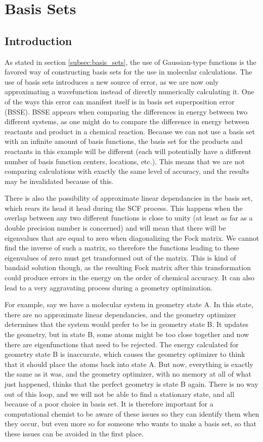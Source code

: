 \chapter{Basis Sets}
\label{chap:basis_sets}
\section{Introduction}
As stated in section \ref{subsec:basis_sets}, the use of Gaussian-type functions is the favored way of constructing basis sets for the use in molecular calculations. The use of basis sets introduces a new source of error, as we are now only approximating a wavefunction instead of directly numerically calculating it. One of the ways this error can manifest itself is in basis set superposition error (BSSE). BSSE appears when comparing the differences in energy between two different systems, as one might do to compare the difference in energy between reactants and product in a chemical reaction. Because we can not use a basis set with an infinite amount of basis functions, the basis set for the products and reactants in this example will be different (each will potentially have a different number of basis function centers, locations, etc.). This means that we are not comparing calculations with exactly the same level of accuracy, and the results may be invalidated because of this. 

There is also the possibility of approximate linear dependancies in the basis set, which rears its head it head during the SCF process. This happens when the overlap between any two different functions is close to unity (at least as far as a double precision number is concerned) and will mean that there will be eigenvalues that are equal to zero when diagonalizing the Fock matrix. We cannot find the inverse of such a matrix, so therefore the functions leading to these eigenvalues of zero must get transformed out of the matrix. This is kind of bandaid solution though, as the resulting Fock matrix after this transformation could produce errors in the energy on the order of chemical accuracy. It can also lead to a very aggravating process during a geometry optimization. 

For example, say we have a molecular system in geometry state A. In this state, there are no approximate linear dependancies, and the geometry optimizer determines that the system would prefer to be in geometry state B. It updates the geometry, but in state B, some atoms might be too close together and now there are eigenfunctions that need to be rejected. The energy calculated for geometry state B is inaccurate, which causes the geometry optimizer to think that it should place the atoms back into state A. But now, everything is exactly the same as it was, and the geometry optimizer, with no memory at all of what just happened, thinks that the perfect geometry is state B again. There is no way out of this loop, and we will not be able to find a stationary state, and all because of a poor choice in basis set. It is therefore important for a computational chemist to be aware of these issues so they can identify them when they occur, but even more so for someone who wants to make a basis set, so that these issues can be avoided in the first place.


